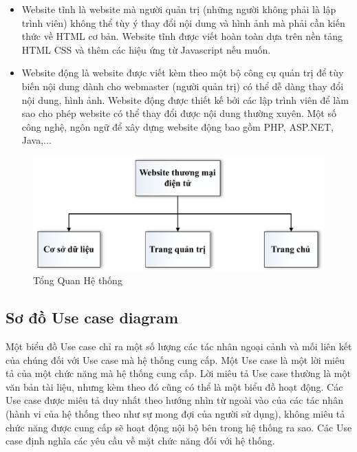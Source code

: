 \begin{itemize}
\begin{itemize}
    \item Website tĩnh là website mà người quản trị (những người không phải là lập trình viên) không thể tùy ý thay đổi nội dung và hình ảnh mà phải cần kiến thức về HTML cơ bản. Website tĩnh được viết hoàn toàn dựa trên nền tảng HTML CSS và thêm các hiệu ứng từ Javascript nếu muốn.
    \item Website động là website được viết kèm theo một bộ công cụ quản trị để tùy biến nội dung dành cho webmaster (người quản trị) có thể dễ dàng thay đổi nội dung, hình ảnh. Website động được thiết kế bởi các lập trình viên để làm sao cho phép website có thể thay đổi được nội dung thường xuyên. Một số công nghệ, ngôn ngữ để xây dựng website động bao gồm PHP, ASP.NET, Java,...
    \end{itemize}
\end{itemize}
\begin{center}
    \begin{figure}[h]
    \begin{center}
     \includegraphics[scale=0.7]{image/TongQuanHeThong.pdf}
    \end{center}
    \caption{Tổng Quan Hệ thống}
    \label{refhinh3_1}
    \end{figure}
\end{center}
\subsection{Sơ đồ Use case diagram}
Một biểu đồ Use case chỉ ra một số lượng các tác nhân ngoại cảnh và mối liên
kết của chúng đối với Use case mà hệ thống cung cấp. Một Use case là một lời miêu tả của một chức năng mà hệ thống cung cấp. Lời miêu tả Use case thường là một văn bản tài liệu, nhưng kèm theo đó cũng có thể là một biểu đồ hoạt động. Các Use case được miêu tả duy nhất theo hướng nhìn từ ngoài vào của các tác nhân (hành vi của hệ thống theo như sự mong đợi của người sử dụng), không miêu tả chức năng được cung cấp sẽ hoạt động nội bộ bên trong hệ thống ra sao. Các Use case định nghĩa các yêu cầu về mặt chức năng đối với hệ thống.
